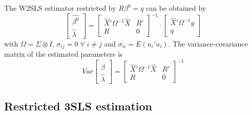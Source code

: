 The W2SLS estimator restricted by $R \beta^0 = q$ can be obtained by
\begin{equation}
   \left[ \begin{array}{c}
      \widehat{\beta^0} \\ \widehat{\lambda}
   \end{array} \right]
   =
   \left[ \begin{array}{cc}
      \widehat{X}' \Omega^{-1} \widehat{X} & R' \\ 
      R & 0
   \end{array} \right]^{-1}
   \cdot
   \left[ \begin{array}{c}
      \widehat{X}' \Omega^{-1} y \\ q 
   \end{array} \right]
\end{equation}
with $\Omega = \Sigma \otimes I$, 
$\sigma_{ij} = 0 \; \forall \; i \neq j$ and
$\sigma_{ii} = E \left( u_i' u_i \right)$.
The variance-covariance matrix of the estimated parameters is
\begin{equation}
   Var 
   \left[ \begin{array}{c}
      \widehat{\beta} \\ \widehat{\lambda}
   \end{array} \right] 
   = 
   \left[ \begin{array}{cc}
      \widehat{X}' \Omega^{-1} \widehat{X} & R' \\ 
      R & 0
   \end{array} \right]^{-1}
\end{equation}


\subsection{Restricted 3SLS estimation}
\label{sec:3slsR}

